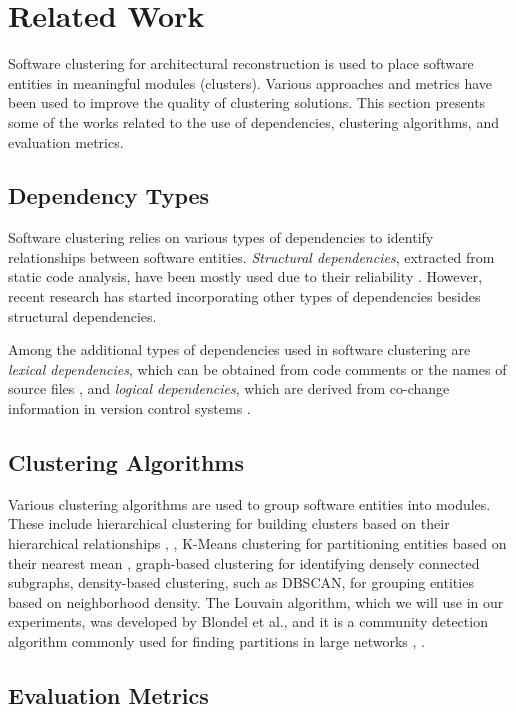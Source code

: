 \documentclass{ieeeaccess}
\begin{document}
\section{Related Work}
\label{sec:related_work}

Software clustering for architectural reconstruction is used to place software entities in meaningful modules (clusters). Various approaches and metrics have been used to improve the quality of clustering solutions. This section presents some of the works related to the use of dependencies, clustering algorithms, and evaluation metrics.

\subsection{Dependency Types}

Software clustering relies on various types of dependencies to identify relationships between software entities. \textit{Structural dependencies}, extracted from static code analysis, have been mostly used due to their reliability \cite{b12}. However, recent research has started incorporating other types of dependencies besides structural dependencies.

Among the additional types of dependencies used in software clustering are \textit{lexical dependencies}, which can be obtained from code comments \cite{b13} or the names of source files \cite{b14}, and \textit{logical dependencies}, which are derived from co-change information in version control systems \cite{b16}.

\subsection{Clustering Algorithms}

Various clustering algorithms are used to group software entities into modules. These include hierarchical clustering for building clusters based on their hierarchical relationships \cite{b12}, \cite{b16}, K-Means clustering for partitioning entities based on their nearest mean \cite{b17}, graph-based clustering for identifying densely connected subgraphs, density-based clustering, such as DBSCAN, for grouping entities based on neighborhood density. The Louvain algorithm, which we will use in our experiments, was developed by Blondel et al., and it is a community detection algorithm commonly used for finding partitions in large networks \cite{b8}, \cite{b9}.

\subsection{Evaluation Metrics}
\end{document}
